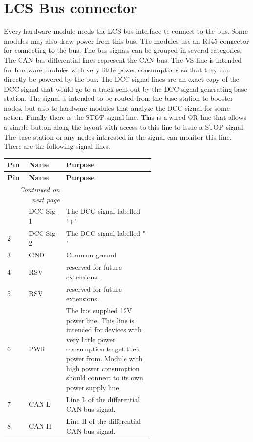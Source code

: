 \section{LCS Bus connector}

Every hardware module needs the LCS bus interface to connect to the bus. Some modules may also draw power from this bus. The modules use an RJ45 connector for connecting to the bus. The bus signals can be grouped in several categories. The CAN bus differential lines represent the CAN bus. The VS line is intended for hardware modules with very little power consumptions so that they can directly be powered by the bus. The DCC signal lines are an exact copy of the DCC signal that would go to a track sent out by the DCC signal generating base station. The signal is intended to be routed from the base station to booster nodes, but also to hardware modules that analyze the DCC signal for some action. Finally there is the STOP signal line. This is a wired OR line that allows a simple button along the layout with access to this line to issue a STOP signal. The base station or any nodes interested in the signal can monitor this line. There are the following signal lines.

\begin{longtable}{@{}|l|l|p{0.6\linewidth}|@{}}
    \toprule
    \textbf{Pin} & \textbf{Name} & \textbf{Purpose} \\
    \midrule
    \endfirsthead
    \toprule
    \textbf{Pin} & \textbf{Name} & \textbf{Purpose} \\
    \midrule
    \endhead
    \midrule
    \multicolumn{2}{r}{\textit{Continued on next page}} \\
    \midrule
    \endfoot
    \bottomrule
    \endlastfoot
    1 & DCC-Sig-1 & The DCC signal labelled "+" \\
    \midrule
    2 & DCC-Sig-2 & The DCC signal labelled "-" \\
    \midrule
    3 & GND & Common ground \\
    \midrule
    4 & RSV & reserved for future extensions. \\
    \midrule
    5 & RSV & reserved for future extensions. \\
    \midrule
    6 & PWR & The bus supplied 12V power line. This line is intended for devices with very little power consumption to get their power from. Module with high power consumption should connect to its own power supply line. \\
    \midrule
    7 & CAN-L &  Line L of the differential CAN bus signal. \\
    \midrule
    8 & CAN-H &  Line H of the differential CAN bus signal. \\
\end{longtable}

